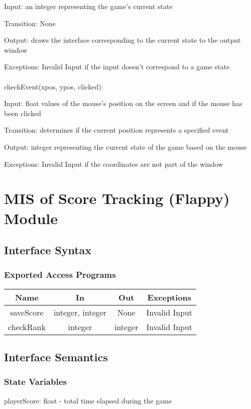 \documentclass[12pt, titlepage]{article}
\begin{document}
		Input: an integer representing the game's current state
		
		Transition: None
		
		Output: draws the interface corresponding to the current state to the output window
		
		Exceptions: Invalid Input if the input doesn't correspond to a game state\\
		\\
		checkEvent(xpos, ypos, clicked):
		
		Input: float values of the mouse's position on the screen and if the mouse has been clicked
		
		Transition: determines if the current position represents a specified event
		
		Output: integer representing the current state of the game based on the mouse
		
		Exceptions: Invalid Input if the coordinates are not part of the window


\section{MIS of Score Tracking (Flappy) Module}
		\subsection{Interface Syntax}
		\subsubsection{Exported Access Programs}
		\begin{tabular}[pos]{|c|c|c|c|}
			\hline
			\textbf{Name}& \textbf{In} & \textbf{Out} & \textbf{Exceptions} \\ \hline
			saveScore & integer, integer & None & Invalid Input \\ \hline
			checkRank & integer & integer & Invalid Input \\ \hline
		\end{tabular}
		
		\subsection{Interface Semantics}
		\subsubsection{State Variables}
		playerScore: float - total time elapsed during the game \\
		
\end{document}
